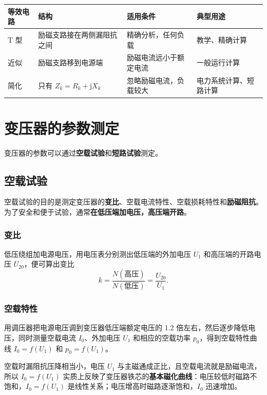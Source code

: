 \begin{center}
\begin{tabular}{@{}p{2.4cm}p{3.6cm}p{4.2cm}p{3.4cm}@{}}
\toprule
等效电路 & 结构 & 适用条件 & 典型用途 \\
\midrule
T 型 & 励磁支路接在两侧漏阻抗之间 & 精确分析，任何负载 & 教学、精确计算 \\
近似 & 励磁支路移到电源端 & 励磁电流远小于额定电流 & 一般运行计算 \\
简化 & 只有 $Z_k=R_k+\mathrm{j}X_k$ & 忽略励磁电流，负载较大 & 电力系统计算、短路计算 \\
\bottomrule
\end{tabular}
\end{center}

\section{变压器的参数测定}

变压器的参数可以通过\textbf{空载试验}和\textbf{短路试验}测定。

\subsection{空载试验}
空载试验的目的是测定变压器的\textbf{变比}、空载电流特性、空载损耗特性和\textbf{励磁阻抗}。为了安全和便于试验，通常\textbf{在低压端加电压，高压端开路}。

\subsubsection{变比}
低压绕组加电源电压，用电压表分别测出低压端的外加电压 $U_1$ 和高压端的开路电压 $U_{20}$，便可算出变比
\begin{equation}
k=\frac{N(\text{高压})}{N(\text{低压})}=\frac{U_{20}}{U_1}.
\end{equation}

\subsubsection{空载特性}
用调压器把电源电压调到变压器低压端额定电压的 1.2 倍左右，然后逐步降低电压，同时测量空载电流 $I_0$、外加电压 $U_1$ 和相应的空载功率 $p_0$，得到空载特性曲线 $I_0=f(U_1)$ 和 $p_0=f(U_1)$。

空载时漏阻抗压降相当小，电压 $U_1$ 与主磁通成正比，且空载电流就是励磁电流，所以 $I_0=f(U_1)$ 实质上反映了变压器铁芯的\textbf{基本磁化曲线}：电压较低时磁路不饱和，$I_0=f(U_1)$ 是线性关系；电压增高时磁路逐渐饱和，$I_0$ 迅速增加。

